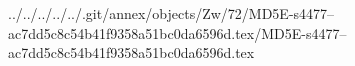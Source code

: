 ../../../../../.git/annex/objects/Zw/72/MD5E-s4477--ac7dd5c8c54b41f9358a51bc0da6596d.tex/MD5E-s4477--ac7dd5c8c54b41f9358a51bc0da6596d.tex